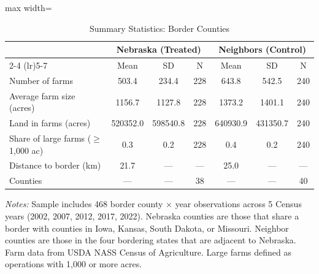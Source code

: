 \begin{table}[H]
\centering
\caption{Summary Statistics: Border Counties}
\label{tab:summary}
\begin{threeparttable}
\begin{adjustbox}{max width=\textwidth}
\begin{tabular}{lcccccc}
\toprule
 & \multicolumn{3}{c}{Nebraska (Treated)} & \multicolumn{3}{c}{Neighbors (Control)} \\
\cmidrule(lr){2-4} \cmidrule(lr){5-7}
 & Mean & SD & N & Mean & SD & N \\
\midrule
Number of farms & 503.4 & 234.4 & 228 & 643.8 & 542.5 & 240 \\
Average farm size (acres) & 1156.7 & 1127.8 & 228 & 1373.2 & 1401.1 & 240 \\
Land in farms (acres) & 520352.0 & 598540.8 & 228 & 640930.9 & 431350.7 & 240 \\
Share of large farms ($\geq$1,000 ac) & 0.3 & 0.2 & 228 & 0.4 & 0.2 & 240 \\
Distance to border (km) & 21.7 & --- & --- & 25.0 & --- & --- \\
Counties & --- & --- & 38 & --- & --- & 40 \\
\bottomrule
\end{tabular}
\end{adjustbox}
\begin{tablenotes}[flushleft]
\small
\item \textit{Notes:} Sample includes 468 border county $\times$ year observations across 5 Census years (2002, 2007, 2012, 2017, 2022). Nebraska counties are those that share a border with counties in Iowa, Kansas, South Dakota, or Missouri. Neighbor counties are those in the four bordering states that are adjacent to Nebraska. Farm data from USDA NASS Census of Agriculture. Large farms defined as operations with 1,000 or more acres.
\end{tablenotes}
\end{threeparttable}
\end{table}
